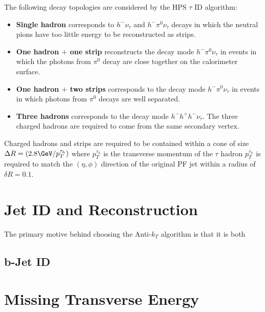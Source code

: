 The following decay topologies are considered by the HPS $\tau$ ID algorithm:%
\begin{itemize}
\item{\bf Single hadron}
      corresponds to $ h^{-} \nu_{\tau}$
      and $ h^{-} \pi^{0} \nu_{\tau}$ decays
      in which the neutral pions have too little energy to be reconstructed as strips.
\item{\bf One hadron $+$ one strip}
      reconstructs the decay mode $ h^{-} \pi^{0} \nu_{\tau}$
      in events in which the photons from $\pi^{0}$ decay
      are close together on the calorimeter surface.
\item{\bf One hadron $+$ two strips}
      corresponds to the decay mode $ h^{-} \pi^{0} \nu_{\tau}$
      in events in which photons from $\pi^{0}$ decays are well separated.
\item{\bf Three hadrons}
      corresponds to the decay mode $ h^{-} h^{+} h^{-} \nu_{\tau}$.
      The three charged hadrons are required                                                                                                      
      to come from the same secondary vertex.
\end {itemize}

Charged hadrons and strips are required to be contained within a cone
of size $\Delta R=(2.8\GeV/p_{T}^{\tau_{h}})$ where $p_{T}^{\tau_{h}}$ is 
the transverse momentum of the $\tau$ hadron $p_{T}^{\tau_{h}}$ is 
required to match the $(\eta,\phi)$ direction of the original PF jet within
a radius of $\delta R=0.1$. 


\section{Jet ID and Reconstruction}
The primary motive behind choosing the Anti-$k_{T}$ algorithm is that it is both


\subsection{b-Jet ID}
\section{Missing Transverse Energy}
